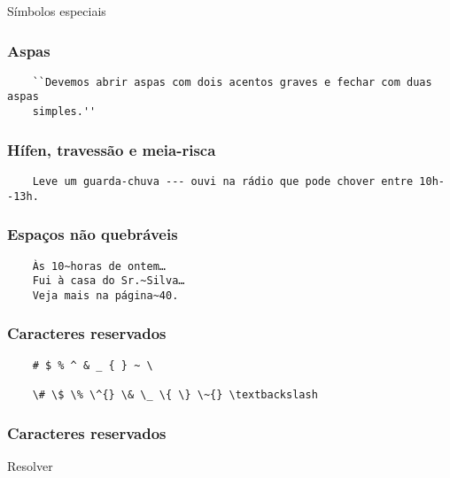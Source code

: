 \begin{frame}[standout]
  \Huge
  Símbolos especiais
\end{frame}

\begin{frame}[fragile]
  \frametitle{Aspas}
  \begin{verbatim}
    ``Devemos abrir aspas com dois acentos graves e fechar com duas aspas
    simples.''
  \end{verbatim}
\end{frame}

\begin{frame}[fragile]
  \frametitle{Hífen, travessão e meia-risca}
  \begin{verbatim}
    Leve um guarda-chuva --- ouvi na rádio que pode chover entre 10h--13h.
  \end{verbatim}
\end{frame}

\begin{frame}[fragile]
  \frametitle{Espaços não quebráveis}
  \begin{verbatim}
    Às 10~horas de ontem…
    Fui à casa do Sr.~Silva…
    Veja mais na página~40.
  \end{verbatim}
\end{frame}

\begin{frame}[fragile]
  \frametitle{Caracteres reservados}
  \begin{verbatim}
    # $ % ^ & _ { } ~ \

    \# \$ \% \^{} \& \_ \{ \} \~{} \textbackslash
  \end{verbatim}
\end{frame}

\begin{frame}
  \frametitle{Caracteres reservados}
  \huge
  Resolver 
\end{frame}
